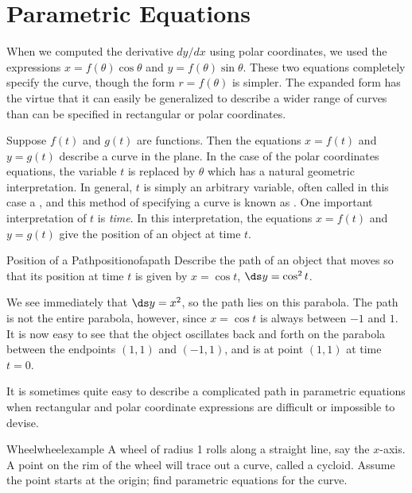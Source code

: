 \section{Parametric Equations}\label{sec:Parametric Equations}
When we computed the derivative $dy/dx$ using polar coordinates, we
used the expressions $x=f(\theta)\cos\theta$ and
$y=f(\theta)\sin\theta$. These two equations completely specify the
curve, though the form $r=f(\theta)$ is simpler. The expanded form has
the virtue that it can easily be generalized to describe a wider range
of curves than can be specified in rectangular or polar coordinates. 

Suppose $f(t)$ and $g(t)$ are functions. Then the equations
$x=f(t)$ and $y=g(t)$ describe a curve in the plane. In the case of
the polar coordinates equations, the variable $t$ is replaced by
$\theta$ which has a natural geometric interpretation. In general, $t$
is simply an arbitrary variable, often called in this case a
, and this method of specifying a curve is known as 
. One
important interpretation of $t$ is {\it time}. In this interpretation,
the equations $x=f(t)$ and $y=g(t)$ give the position of an object at
time $t$.

\begin{example}{Position of a Path}{positionofapath}
 Describe the path of an object that moves so that its
position at time $t$ is given by $x=\cos t$, $\ds y=\cos^2 t$.
\end{example}

\begin{solution}
We see immediately that $\ds y=x^2$, so the path lies on this parabola. The path
is not the entire parabola, however, since $x=\cos t$ is always
between $-1$ and $1$. It is now easy to see that the object oscillates
back and forth on the parabola between the endpoints $(1,1)$ and
$(-1,1)$, and is at point $(1,1)$ at time $t=0$.
\end{solution}

It is sometimes quite easy to describe a complicated path in
parametric equations when rectangular and polar coordinate expressions
are difficult or impossible to devise.

\begin{example}{Wheel}{wheelexample}
 A wheel of radius 1 rolls along a straight line, say the
$x$-axis. A point on the rim of the wheel will trace out a curve, called a
cycloid. Assume the point starts at the origin; find
parametric equations for the curve.
\end{example}

